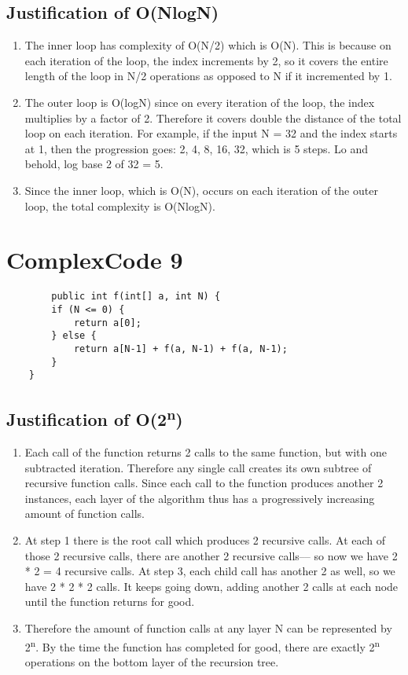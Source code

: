 \documentclass[11pt]{article}
\begin{document}
  \subsection{Justification of O(NlogN)}
    \begin{enumerate}
      \item The inner loop has complexity of O(N/2) which is O(N). This is because on each iteration of the loop, the index increments by 2, so it covers the entire length of the loop in N/2 operations as opposed to N if it incremented by 1.
      \item The outer loop is O(logN) since on every iteration of the loop, the index multiplies by a factor of 2. Therefore it covers double the distance of the total loop on each iteration. For example, if the input N = 32 and the index starts at 1, then the progression goes: 2, 4, 8, 16, 32, which is 5 steps. Lo and behold, log base 2 of 32 = 5.
      \item Since the inner loop, which is O(N), occurs on each iteration of the outer loop, the total complexity is O(NlogN).
    \end{enumerate}

\section{ComplexCode 9}
  \begin{lstlisting}
    	public int f(int[] a, int N) {
  		if (N <= 0) {
  			return a[0];
  		} else {
  			return a[N-1] + f(a, N-1) + f(a, N-1);
  		}
  	}
  \end{lstlisting}

  \subsection{Justification of O(2\textsuperscript{n})}
    \begin{enumerate}
    \item Each call of the function returns 2 calls to the same function, but with one subtracted iteration. Therefore any single call creates its own subtree of recursive function calls. Since each call to the function produces another 2 instances, each layer of the algorithm thus has a progressively increasing amount of function calls.
    \item At step 1 there is the root call which produces  2 recursive calls. At each of those 2 recursive calls, there are another 2 recursive calls–– so now we have  2 * 2 = 4 recursive calls. At step 3, each child call has another 2 as well, so we have 2 * 2 * 2 calls. It keeps going down, adding another 2 calls at each node until the function returns for good.
    \item Therefore the amount of function calls at any layer N can be represented by 2\textsuperscript{n}. By the time the function has completed for good, there are exactly 2\textsuperscript{n}  operations on the bottom layer of the recursion tree. 
    \end{enumerate}
\end{document}
